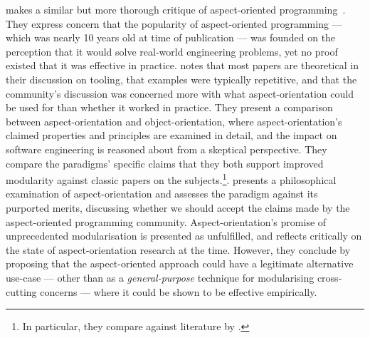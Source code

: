 \citeauthor{steimann06paradoxical} makes a similar but more thorough critique of
aspect-oriented programming~\cite{steimann06paradoxical}. They express concern
that the popularity of aspect-oriented programming --- which was nearly 10 years
old at time of publication --- was founded on the perception that it would solve
real-world engineering problems, yet no proof existed that it was effective in
practice. \citeauthor{steimann06paradoxical} notes that most papers are
theoretical in their discussion on tooling, that examples were typically
repetitive, and that the community's discussion was concerned more with what
aspect-orientation could be used for than whether it worked in practice. They
present a comparison between aspect-orientation and object-orientation, where
aspect-orientation's claimed properties and principles are examined in detail,
and the impact on software engineering is reasoned about from a skeptical
perspective. They compare the paradigms' specific claims that they both support
improved modularity against classic papers on the subjects.\footnote{In
  particular, they compare against literature by \citet{parnas_1972}.}.
\citeauthor{steimann06paradoxical} presents a philosophical examination of
aspect-orientation and assesses the paradigm against its purported merits,
discussing whether we should accept the claims made by the aspect-oriented
programming community. Aspect-orientation's promise of unprecedented
modularisation is presented as unfulfilled, and
\citeauthor{steimann06paradoxical} reflects critically on the state of
aspect-orientation research at the time. However, they conclude by proposing
that the aspect-oriented approach could have a legitimate alternative use-case
--- other than as a \emph{general-purpose} technique for modularising
cross-cutting concerns --- where it could be shown to be effective empirically.

